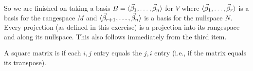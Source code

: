 \begin{exercises}
\begin{answer}
\begin{exparts}
          So we are finished on taking a basis 
          $B=\langle\vec{\beta}_1,\ldots,\vec{\beta}_n\rangle$ for $V$ where
          $\langle\vec{\beta}_1,\ldots,\vec{\beta}_r\rangle$ is a basis for 
          the rangespace $M$ and 
          $\langle\vec{\beta}_{r+1},\ldots,\vec{\beta}_n\rangle$ is a 
          basis for the nullspace $N$.
        \partsitem Every projection (as defined in this exercise) is 
          a projection into its rangespace and along its nullspace.
        \partsitem This also follows immediately from the third item.
      \end{exparts}
    \end{answer}
  \item 
    A square matrix is %
    if each \( i,j \) entry equals the
    \( j,i \) entry (i.e., if the matrix equals its transpose).

\end{exercises}
